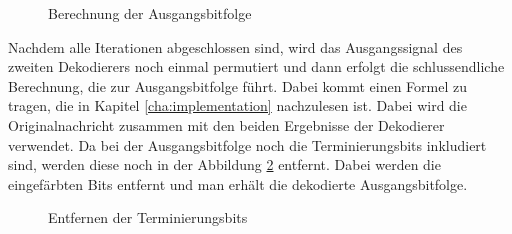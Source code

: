 \begin{figure}[!ht]
\centering
{}
\caption{Berechnung der Ausgangsbitfolge}
\label{pic:TurboDecodeBack}
\end{figure}

Nachdem alle Iterationen abgeschlossen sind, wird das Ausgangssignal des zweiten Dekodierers noch einmal permutiert und dann erfolgt die schlussendliche Berechnung, die zur Ausgangsbitfolge führt. Dabei kommt einen Formel zu tragen, die in Kapitel \ref{cha:implementation} nachzulesen ist. Dabei wird die Originalnachricht zusammen mit den beiden Ergebnisse der Dekodierer verwendet. Da bei der Ausgangsbitfolge noch die Terminierungsbits inkludiert sind, werden diese noch in der Abbildung \ref{pic:TurboDecodeTerminate} entfernt. Dabei werden die eingefärbten Bits entfernt und man erhält die dekodierte Ausgangsbitfolge.

\begin{figure}[!ht]
\centering
{}
\caption{Entfernen der Terminierungsbits}
\label{pic:TurboDecodeTerminate}
\end{figure}

